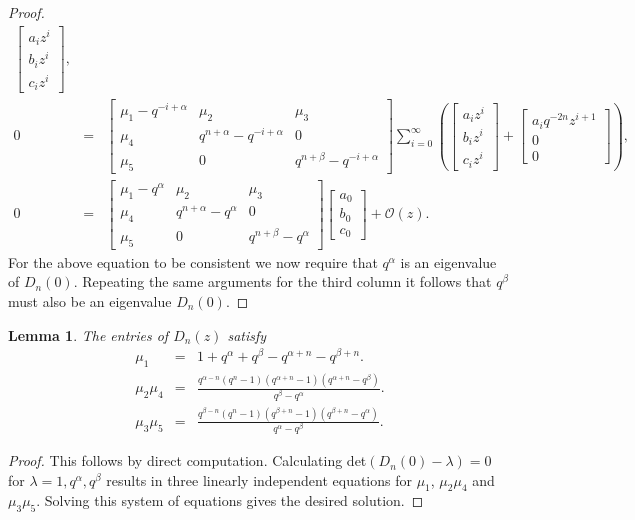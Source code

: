 \documentclass[a4paper,reqno]{amsart}
\numberwithin{equation}{section}
\newtheorem{lemma}[theorem]{Lemma}
\numberwithin{figure}{section}
\begin{document}
\begin{proof}
\begin{eqnarray}
\begin{bmatrix}
   a_i z^i\\
   b_i z^i\\
    c_i z^i
 \end{bmatrix},\nonumber\\
 0
 &=& \begin{bmatrix}
    \mu_{1}-q^{-i+\alpha} & \mu_{2} &\mu_{3}\\
   \mu_{4}&q^{n+\alpha}-q^{-i+\alpha}&0 \\
   \mu_{5}&0&q^{n+\beta}-q^{-i+\alpha}
   \end{bmatrix}\sum_{i=0}^\infty\left(\begin{bmatrix}
   a_i z^i\\
   b_i z^i\\
    c_i z^i
 \end{bmatrix}+ \begin{bmatrix}
   a_i q^{-2n}z^{i+1}\\
   0\\
    0
 \end{bmatrix}\right),\nonumber\\
  0
 &=& \begin{bmatrix}
    \mu_{1}-q^{\alpha} & \mu_{2} &\mu_{3}\\
   \mu_{4}&q^{n+\alpha}-q^{\alpha}&0 \\
   \mu_{5}&0&q^{n+\beta}-q^{\alpha}
   \end{bmatrix} \begin{bmatrix}
   a_0 \\
   b_0 \\
    c_0 
 \end{bmatrix}+ \mathcal{O}(z).\label{Equation X}
\end{eqnarray}
For the above equation to be consistent we now require that $q^\alpha$ is an eigenvalue of $D_n(0)$. Repeating the same arguments for the third column it follows that $q^{\beta}$ must also be an eigenvalue $D_n(0)$.
\end{proof}

\begin{lemma}\label{coeff determination}
    The entries of $D_n(z)$ satisfy
    \begin{eqnarray}
        \mu_1 &=& 1+q^\alpha +q^\beta - q^{\alpha+n} - q^{\beta+n}.\\
        \mu_2\mu_4 &=& \frac{q^{\alpha-n}(q^n-1)(q^{\alpha+n}-1)(q^{\alpha+n}-q^\beta)}{q^{\beta}-q^\alpha}.\\
        \mu_3\mu_5 &=& \frac{q^{\beta-n}(q^n-1)(q^{\beta+n}-1)(q^{\beta+n}-q^\alpha)}{q^{\alpha}-q^\beta}.
    \end{eqnarray}
\end{lemma}
\begin{proof}
    This follows by direct computation. Calculating det$(D_n(0)-\lambda)=0$ for $\lambda = 1, q^\alpha, q^\beta$ results in three linearly independent equations for $\mu_1$, $\mu_2\mu_4$ and $\mu_3\mu_5$. Solving this system of equations gives the desired solution.
\end{proof}
\end{document}
